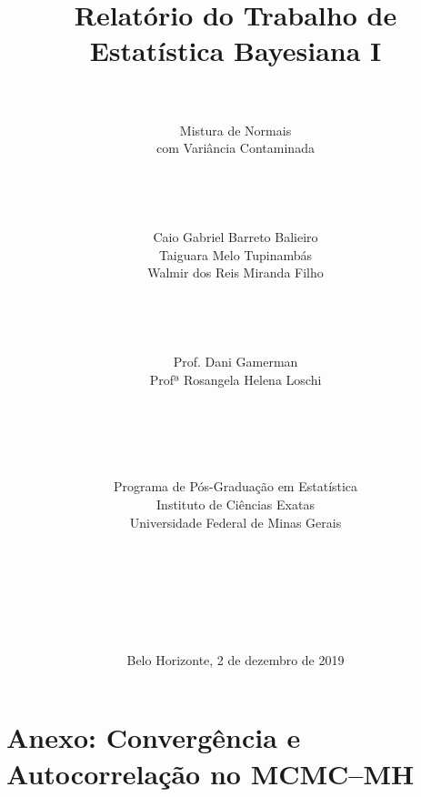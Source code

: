 \documentclass[12pt,reqno,a4paper,oneside]{article}
\begin{document}
	
	\title{\huge Relatório do Trabalho de\\
		Estatística Bayesiana I}
	\author{\\
		\\
		\huge Mistura de Normais\\
		\huge com Variância Contaminada\\
		\\
		\\
		\\
		\\
		\Large Caio Gabriel Barreto Balieiro\\
		\Large Taiguara Melo Tupinambás\\
		\Large Walmir dos Reis Miranda Filho\\
		\\
		\\
		\\
		\\
		\Large Prof. Dani Gamerman\\
		\Large Profª Rosangela Helena Loschi\\
		\\
		\\
		\\
		\\
		\\
		Programa de Pós-Graduação em Estatística\\
		Instituto de Ciências Exatas\\
		Universidade Federal de Minas Gerais\\
		\\
		\\
		\\
		\\
		\\
		\\}
	\date{Belo Horizonte, 2 de dezembro de 2019}
	\maketitle
	
	\newpage
	
	
	
	
	
	
	
	
	
	
	\newpage
	
	
	
	\newpage
	
	\section*{Anexo: Convergência e Autocorrelação no MCMC--MH}
	
\end{document}
